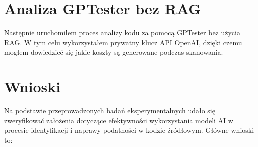 \section{Analiza GPTester bez RAG}
Następnie uruchomiłem proces analizy kodu za pomocą GPTester bez użycia RAG. W tym celu wykorzystałem prywatny klucz API OpenAI, dzięki czemu mogłem dowiedzieć się jakie koszty są generowane podczas skanowania. 

\section{Wnioski}
\label{sec:wnioski}

Na podstawie przeprowadzonych badań eksperymentalnych udało się zweryfikować założenia dotyczące efektywności wykorzystania modeli AI w procesie identyfikacji i naprawy podatności w kodzie źródłowym. Główne wnioski to:


